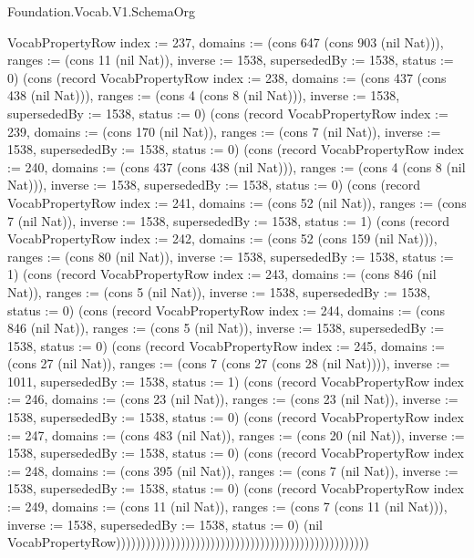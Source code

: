 \begin{lexlean}{Foundation.Vocab.V1.SchemaOrg}
\begin{semanticmodule}
{VocabPropertyRow {index := 237, domains := (cons 647 (cons 903 (nil Nat))), ranges := (cons 11 (nil Nat)), inverse := 1538, supersededBy := 1538, status := 0}) (cons (record VocabPropertyRow {index := 238, domains := (cons 437 (cons 438 (nil Nat))), ranges := (cons 4 (cons 8 (nil Nat))), inverse := 1538, supersededBy := 1538, status := 0}) (cons (record VocabPropertyRow {index := 239, domains := (cons 170 (nil Nat)), ranges := (cons 7 (nil Nat)), inverse := 1538, supersededBy := 1538, status := 0}) (cons (record VocabPropertyRow {index := 240, domains := (cons 437 (cons 438 (nil Nat))), ranges := (cons 4 (cons 8 (nil Nat))), inverse := 1538, supersededBy := 1538, status := 0}) (cons (record VocabPropertyRow {index := 241, domains := (cons 52 (nil Nat)), ranges := (cons 7 (nil Nat)), inverse := 1538, supersededBy := 1538, status := 1}) (cons (record VocabPropertyRow {index := 242, domains := (cons 52 (cons 159 (nil Nat))), ranges := (cons 80 (nil Nat)), inverse := 1538, supersededBy := 1538, status := 1}) (cons (record VocabPropertyRow {index := 243, domains := (cons 846 (nil Nat)), ranges := (cons 5 (nil Nat)), inverse := 1538, supersededBy := 1538, status := 0}) (cons (record VocabPropertyRow {index := 244, domains := (cons 846 (nil Nat)), ranges := (cons 5 (nil Nat)), inverse := 1538, supersededBy := 1538, status := 0}) (cons (record VocabPropertyRow {index := 245, domains := (cons 27 (nil Nat)), ranges := (cons 7 (cons 27 (cons 28 (nil Nat)))), inverse := 1011, supersededBy := 1538, status := 1}) (cons (record VocabPropertyRow {index := 246, domains := (cons 23 (nil Nat)), ranges := (cons 23 (nil Nat)), inverse := 1538, supersededBy := 1538, status := 0}) (cons (record VocabPropertyRow {index := 247, domains := (cons 483 (nil Nat)), ranges := (cons 20 (nil Nat)), inverse := 1538, supersededBy := 1538, status := 0}) (cons (record VocabPropertyRow {index := 248, domains := (cons 395 (nil Nat)), ranges := (cons 7 (nil Nat)), inverse := 1538, supersededBy := 1538, status := 0}) (cons (record VocabPropertyRow {index := 249, domains := (cons 11 (nil Nat)), ranges := (cons 7 (cons 11 (nil Nat))), inverse := 1538, supersededBy := 1538, status := 0}) (nil VocabPropertyRow)))))))))))))))))))))))))))))))))))))))))))))))))))
}


\end{semanticmodule}
\end{lexlean}
